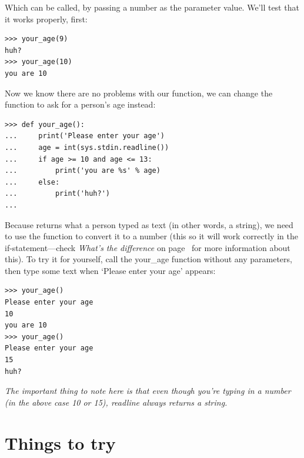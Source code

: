 Which can be called, by passing a number as the parameter value.  We'll test that it works properly, first:

\begin{listing}
\begin{verbatim}
>>> your_age(9)
huh?
>>> your_age(10)
you are 10
\end{verbatim}
\end{listing}

Now we know there are no problems with our function, we can change the function to ask for a person's age instead:

\begin{listing}
\begin{verbatim}
>>> def your_age():
...     print('Please enter your age')
...     age = int(sys.stdin.readline())
...     if age >= 10 and age <= 13:
...         print('you are %s' % age)
...     else:
...         print('huh?')
... 
\end{verbatim}
\end{listing}

Because  returns what a person typed as text (in other words, a string), we need to use the function  to convert it to a number (this so it will work correctly in the if-statement---check \emph{What's the difference} on page~\pageref{whatsthedifference} for more information about this).  To try it for yourself, call the your\_age function without any parameters, then type some text when `Please enter your age' appears:

\begin{listingignore}
\begin{verbatim}
>>> your_age()
Please enter your age
10
you are 10
>>> your_age()
Please enter your age
15
huh?
\end{verbatim}
\end{listingignore}

\noindent
\emph{The important thing to note here is that even though you're typing in a number (in the above case 10 or 15), readline always returns a string.}


\section{Things to try}

